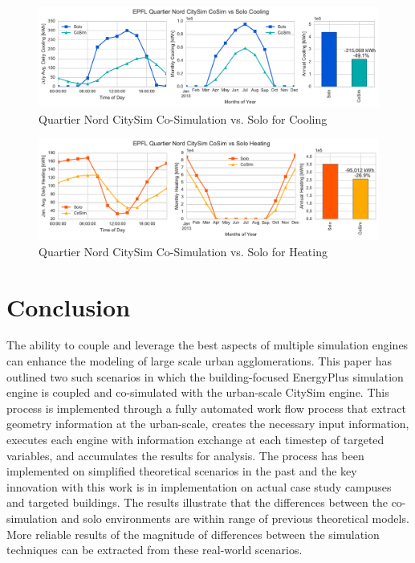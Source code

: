 \documentclass{tBPS2e}
\theoremstyle{plain}
\theoremstyle{definition}
\theoremstyle{remark}
\begin{document}
\begin{figure}[H]
\centering
\includegraphics[scale=0.55]{figures/QN_CitySim_Cooling}
\caption{Quartier Nord CitySim Co-Simulation vs. Solo for Cooling}
\label{fig:qn_citysim_cosimvssolo_cooling}
\end{figure}

\begin{figure}[H]
\centering
\includegraphics[scale=0.55]{figures/QN_CitySim_Heating}
\caption{Quartier Nord CitySim Co-Simulation vs. Solo for Heating}
\label{fig:qn_citysim_cosimvssolo_heating}
\end{figure}


\section{Conclusion}
The ability to couple and leverage the best aspects of multiple simulation engines can enhance the modeling of large scale urban agglomerations. This paper has outlined two such scenarios in which the building-focused EnergyPlus simulation engine is coupled and co-simulated with the urban-scale CitySim engine. This process is implemented through a fully automated work flow process that extract geometry information at the urban-scale, creates the necessary input information, executes each engine with information exchange at each timestep of targeted variables, and accumulates the results for analysis. The process has been implemented on simplified theoretical scenarios in the past and the key innovation with this work is in implementation on actual case study campuses and targeted buildings. The results illustrate that the differences between the co-simulation and solo environments are within range of previous theoretical models. More reliable results of the magnitude of differences between the simulation techniques can be extracted from these real-world scenarios.
\end{document}
